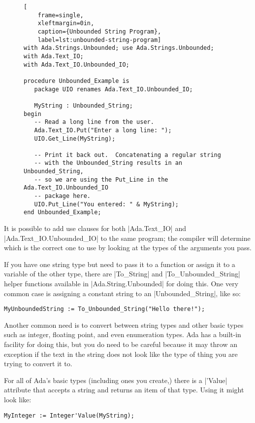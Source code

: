 \begin{figure}[tbhp]
    \begin{lstlisting}[
    frame=single,
    xleftmargin=0in,
    caption={Unbounded String Program},
    label=lst:unbounded-string-program]
with Ada.Strings.Unbounded; use Ada.Strings.Unbounded;
with Ada.Text_IO;
with Ada.Text_IO.Unbounded_IO;

procedure Unbounded_Example is
   package UIO renames Ada.Text_IO.Unbounded_IO;

   MyString : Unbounded_String;
begin
   -- Read a long line from the user.
   Ada.Text_IO.Put("Enter a long line: ");
   UIO.Get_Line(MyString);

   -- Print it back out.  Concatenating a regular string
   -- with the Unbounded_String results in an Unbounded_String,
   -- so we are using the Put_Line in the Ada.Text_IO.Unbounded_IO
   -- package here.
   UIO.Put_Line("You entered: " & MyString);
end Unbounded_Example;
 \end{lstlisting}    
\end{figure}


It is possible to add use clauses for both |Ada.Text_IO| and |Ada.Text_IO.Unbounded_IO| to the
same program; the compiler will determine which is the correct one to use by looking at the
types of the arguments you pass.

If you have one string type but need to pass it to a function or assign it to a variable of the
other type, there are |To_String| and |To_Unbounded_String| helper functions available in
|Ada.String.Unbounded| for doing this. One very common case is assigning a constant string to an
|Unbounded_String|, like so:

\begin{lstlisting}
MyUnboundedString := To_Unbounded_String("Hello there!");
\end{lstlisting}

Another common need is to convert between string types and other basic types such as integer,
floating point, and even enumeration types. Ada has a built-in facility for doing this, but you
do need to be careful because it may throw an exception if the text in the string does not look
like the type of thing you are trying to convert it to.

For all of Ada's basic types (including ones you create,) there is a |'Value| attribute that
accepts a string and returns an item of that type. Using it might look like:

\begin{lstlisting}
MyInteger := Integer'Value(MyString);
\end{lstlisting}

